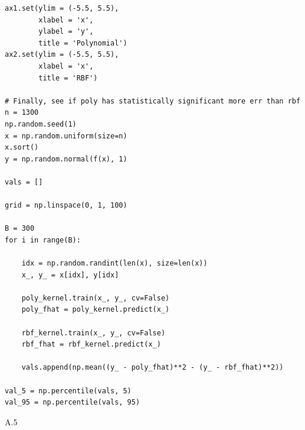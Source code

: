 \documentclass{article}
\begin{document}
\begin{verbatim}
ax1.set(ylim = (-5.5, 5.5),
        xlabel = 'x', 
        ylabel = 'y',
        title = 'Polynomial')
ax2.set(ylim = (-5.5, 5.5),
        xlabel = 'x',
        title = 'RBF')

# Finally, see if poly has statistically significant more err than rbf
n = 1300
np.random.seed(1)
x = np.random.uniform(size=n)
x.sort()
y = np.random.normal(f(x), 1)

vals = []

grid = np.linspace(0, 1, 100)

B = 300
for i in range(B):
    
    idx = np.random.randint(len(x), size=len(x))
    x_, y_ = x[idx], y[idx]

    poly_kernel.train(x_, y_, cv=False)
    poly_fhat = poly_kernel.predict(x_)
    
    rbf_kernel.train(x_, y_, cv=False)
    rbf_fhat = rbf_kernel.predict(x_)
    
    vals.append(np.mean((y_ - poly_fhat)**2 - (y_ - rbf_fhat)**2))
    
val_5 = np.percentile(vals, 5)
val_95 = np.percentile(vals, 95)
\end{verbatim}


\newpage
A.5
\end{document}
